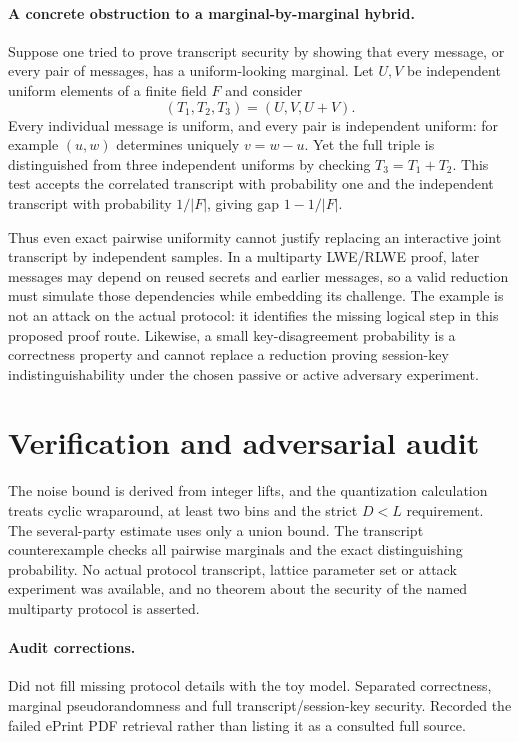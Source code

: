 \documentclass[11pt]{article}
\begin{document}
\paragraph{A concrete obstruction to a marginal-by-marginal hybrid.}
Suppose one tried to prove transcript security by showing that every message, or every pair of messages, has a uniform-looking marginal. Let $U,V$ be independent uniform elements of a finite field $F$ and consider
\[
 (T_1,T_2,T_3)=(U,V,U+V).
\]
Every individual message is uniform, and every pair is independent uniform: for example $(u,w)$ determines uniquely $v=w-u$. Yet the full triple is distinguished from three independent uniforms by checking $T_3=T_1+T_2$. This test accepts the correlated transcript with probability one and the independent transcript with probability $1/|F|$, giving gap $1-1/|F|$.

Thus even exact pairwise uniformity cannot justify replacing an interactive joint transcript by independent samples. In a multiparty LWE/RLWE proof, later messages may depend on reused secrets and earlier messages, so a valid reduction must simulate those dependencies while embedding its challenge. The example is not an attack on the actual protocol: it identifies the missing logical step in this proposed proof route. Likewise, a small key-disagreement probability is a correctness property and cannot replace a reduction proving session-key indistinguishability under the chosen passive or active adversary experiment.
\section{Verification and adversarial audit}
The noise bound is derived from integer lifts, and the quantization calculation treats cyclic wraparound, at least two bins and the strict $D<L$ requirement. The several-party estimate uses only a union bound. The transcript counterexample checks all pairwise marginals and the exact distinguishing probability. No actual protocol transcript, lattice parameter set or attack experiment was available, and no theorem about the security of the named multiparty protocol is asserted.
\paragraph{Audit corrections.} Did not fill missing protocol details with the toy model. Separated correctness, marginal pseudorandomness and full transcript/session-key security. Recorded the failed ePrint PDF retrieval rather than listing it as a consulted full source.
\end{document}
